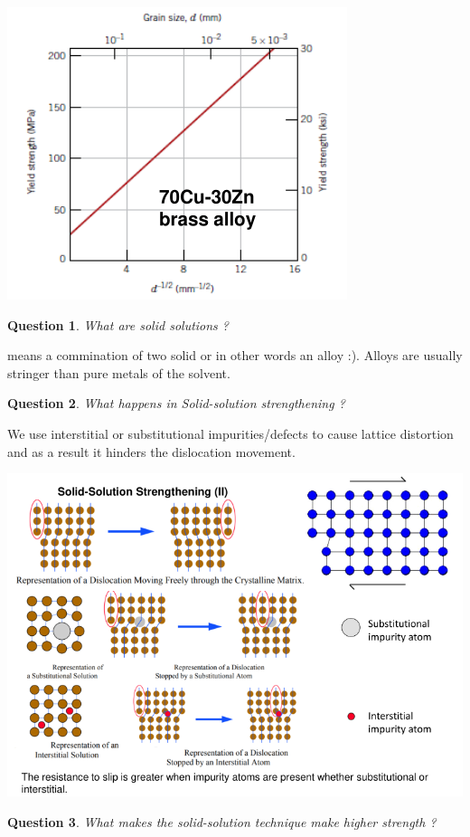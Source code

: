 \documentclass[13]{article}
\newtheorem{exer}{Question}
\begin{document}
\begin{center}
\includegraphics[scale=0.5]{figures/19.png}
\end{center}
\begin{exer}
What are solid solutions ?
\end{exer}
means a commination of two solid or in other words an alloy :). Alloys are usually stringer than pure metals of the solvent. 
\begin{exer}
What happens in Solid-solution strengthening ?
\end{exer}
We use interstitial or substitutional impurities/defects to cause lattice distortion and as a result it hinders the dislocation movement.
\begin{center}
\includegraphics[scale=0.5]{figures/20.png}
\end{center}
\begin{exer}
What makes the solid-solution technique make higher strength ?
\end{exer}
\end{document}
